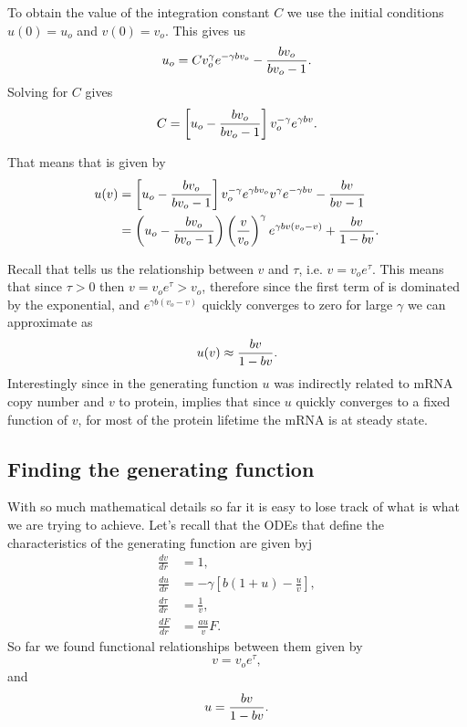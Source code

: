 To obtain the value of the integration constant $C$ we use the initial
conditions $u(0) = u_o$ and $v(0) = v_o$. This gives us
\begin{equation}
  u_o = C v_o^{\gamma} e^{-\gamma b v_o}
  - {b v_o \over b v_o - 1}.
\end{equation}
Solving for $C$ gives
\begin{equation}
  C = \left[ u_o - {b v_o \over b v_o - 1} \right] v_o^{-\gamma} e^{\gamma b v}.
\end{equation}

That means that \eref[eq_SI_30_uofv] is given by
\begin{align}
  u(v) &= \left[ u_o - {b v_o \over b v_o - 1} \right]
  v_o^{-\gamma} e^{\gamma b v_o} v^{\gamma} e^{-\gamma b v}
  - {b v \over b v - 1}\\
  &= \left( u_o - {b v_o \over b v_o - 1}  \right)
  \left( {v \over v_o} \right)^{\gamma}
  e^{\gamma b v (v_o - v)}
  + {b v \over 1 - b v}.
  \label{eq_uofv_with_C}
\end{align}

Recall that  tells us the relationship between $v$ and
$\tau$, i.e. $v = v_o e^{\tau}$. This means that since $\tau > 0$ then
$v = v_o e^{\tau} > v_o$, therefore since the first term of
 is dominated by the exponential, and
$e^{\gamma b (v_o - v)}$ quickly converges to zero for large $\gamma$ we can
approximate  as
\begin{equation}
  u(v) \approx {b v \over 1 - b v}.
  \label{eq_SI_31_uofv}
\end{equation}
Interestingly since in the generating function 
$u$ was indirectly related to mRNA copy number and $v$ to protein,
\eref[eq_SI_31_uofv] implies that since $u$ quickly converges to a fixed
function of $v$, for most of the protein lifetime the mRNA is at steady state.

\subsection{Finding the generating function}

With so much mathematical details so far it is easy to lose track of what is
what we are trying to achieve. Let's recall that the ODEs that define the
characteristics of the generating function are given byj
\begin{align}
  \frac{d v}{d r} &= 1,
  \\
  \frac{d u}{d r} &= - \gamma \left[ b (1 + u) - \frac{u}{v}
  \right],
  \\
  \frac{d \tau}{d r} &= \frac{1}{v},
  \\
  \frac{d F}{d r} &= \frac{a u}{v} F.
\end{align}
So far we found functional relationships between them given by
\begin{equation}
  v = v_o e^{\tau},
\end{equation}
and
\begin{equation}
  u = {b v \over 1 - b v}.
\end{equation}

